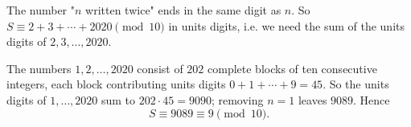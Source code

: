 The number "$n$ written twice" ends in the same digit as $n$. So $S\equiv 2+3+\cdots+2020\pmod{10}$ in units digits, i.e. we need the sum of the units digits of $2,3,\dots,2020$.

The numbers $1,2,\dots,2020$ consist of $202$ complete blocks of ten consecutive integers, each block contributing units digits $0+1+\cdots+9=45$. So the units digits of $1,\dots,2020$ sum to $202\cdot45=9090$; removing $n=1$ leaves $9089$. Hence
\[
S\equiv 9089\equiv \boxed{9}\pmod{10}.
\]
